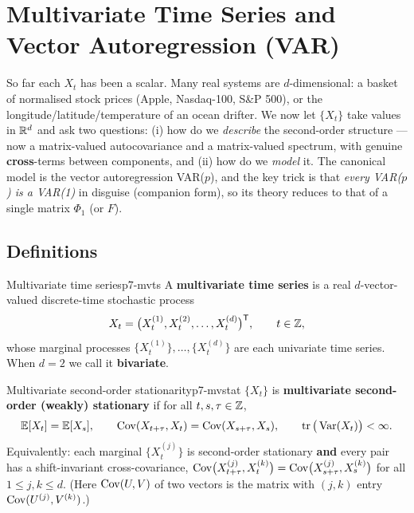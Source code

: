 \section{Multivariate Time Series and Vector Autoregression (VAR)}
\label{sec:multivariate}

So far each $X_t$ has been a scalar. Many real systems are
$d$-dimensional: a basket of normalised stock prices (Apple, Nasdaq-100, S\&P
500), or the longitude/latitude/temperature of an ocean drifter. We now let
$\{X_t\}$ take values in $\mathbb{R}^d$ and ask two questions: (i) how do we
\emph{describe} the second-order structure --- now a matrix-valued
autocovariance and a matrix-valued spectrum, with genuine \textbf{cross}-terms
between components, and (ii) how do we \emph{model} it. The canonical model is
the vector autoregression VAR($p$), and the key trick is that
\emph{every VAR($p$) is a VAR(1)} in disguise (companion form), so its theory
reduces to that of a single matrix $\Phi_1$ (or $F$).

\subsection{Definitions}

\begin{definition}{Multivariate time series}{p7-mvts}
A \textbf{multivariate time series} is a real $d$-vector-valued discrete-time
stochastic process
\[
X_t=\big(X_t^{(1)},X_t^{(2)},\dots,X_t^{(d)}\big)^{\mathsf{T}},\qquad t\in\mathbb{Z},
\]
whose marginal processes $\{X_t^{(1)}\},\dots,\{X_t^{(d)}\}$ are each univariate
time series. When $d=2$ we call it \textbf{bivariate}.
\end{definition}

\begin{definition}{Multivariate second-order stationarity}{p7-mvstat}
$\{X_t\}$ is \textbf{multivariate second-order (weakly) stationary} if for all
$t,s,\tau\in\mathbb{Z}$,
\[
\mathbb{E}[X_t]=\mathbb{E}[X_s],\qquad
\operatorname{Cov}(X_{t+\tau},X_t)=\operatorname{Cov}(X_{s+\tau},X_s),\qquad
\operatorname{tr}\big(\operatorname{Var}(X_t)\big)<\infty .
\]
Equivalently: each marginal $\{X_t^{(j)}\}$ is second-order stationary
\textbf{and} every pair has a shift-invariant cross-covariance,
$\operatorname{Cov}\!\big(X_{t+\tau}^{(j)},X_t^{(k)}\big)=\operatorname{Cov}\!\big(X_{s+\tau}^{(j)},X_s^{(k)}\big)$
for all $1\le j,k\le d$. (Here $\operatorname{Cov}(U,V)$ of two vectors is the matrix with
$(j,k)$ entry $\operatorname{Cov}(U^{(j)},V^{(k)})$.)
\end{definition}

